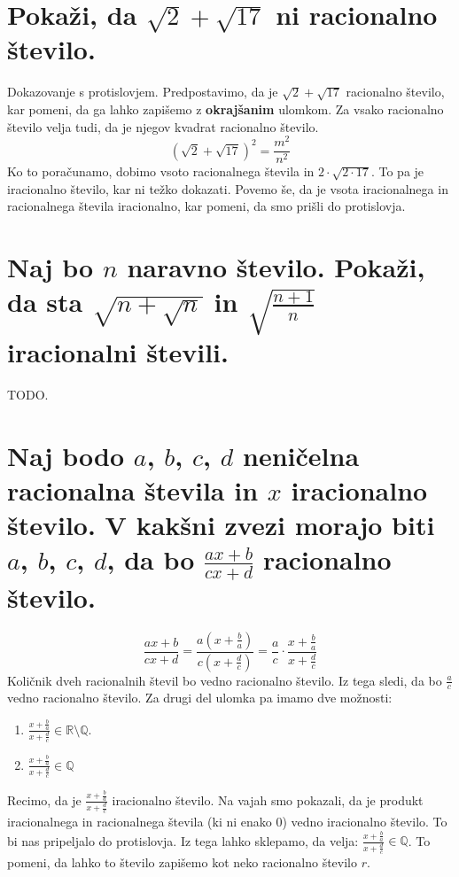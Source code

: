 \documentclass[12pt,a4paper,slovene]{article}
\begin{document}
\section{Pokaži, da $\sqrt{2} + \sqrt{17}$ ni racionalno število.}

Dokazovanje s protislovjem. Predpostavimo, da je $\sqrt{2} + \sqrt{17}$ racionalno število, kar pomeni, da ga lahko zapišemo z \textbf{okrajšanim} ulomkom. Za vsako racionalno število velja tudi, da je njegov kvadrat racionalno število.
\[
\left(\sqrt{2} + \sqrt{17}\right)^2 = \frac{m^2}{n^2}
\]
Ko to poračunamo, dobimo vsoto racionalnega števila in $2 \cdot \sqrt{2 \cdot 17}$. To pa je iracionalno število, kar ni težko dokazati. Povemo še, da je vsota iracionalnega in racionalnega števila iracionalno, kar pomeni, da smo prišli do protislovja.

\section{Naj bo $n$ naravno število. Pokaži, da sta $\sqrt{n + \sqrt{n}}$ in $\sqrt{\frac{n+1}{n}}$ iracionalni števili.}
TODO.

\section{Naj bodo $a$, $b$, $c$, $d$ neničelna racionalna števila in $x$ iracionalno število. V kakšni zvezi morajo biti $a$, $b$, $c$, $d$, da bo $\frac{ax + b}{cx + d}$ racionalno število.}

\[
\frac{ax + b}{cx + d} = \frac{a(x + \frac{b}{a})}{c(x + \frac{d}{c})} = \frac{a}{c} \cdot \frac{x + \frac{b}{a}}{x + \frac{d}{c}}
\]
Količnik dveh racionalnih števil bo vedno racionalno število. Iz tega sledi, da bo $\frac{a}{c}$ vedno racionalno število. Za drugi del ulomka pa imamo dve možnosti:

\begin{enumerate}
	\item $\frac{x + \frac{b}{a}}{x + \frac{d}{c}} \in \mathbb{R} \setminus \mathbb{Q}$.
	\item  $\frac{x + \frac{b}{a}}{x + \frac{d}{c}} \in \mathbb{Q}$
\end{enumerate}

Recimo, da je $\frac{x + \frac{b}{a}}{x + \frac{d}{c}}$ iracionalno število. Na vajah smo pokazali, da je produkt iracionalnega in racionalnega števila (ki ni enako $0$) vedno iracionalno število. To bi nas pripeljalo do protislovja. Iz tega lahko sklepamo, da velja: $\frac{x + \frac{b}{a}}{x + \frac{d}{c}} \in \mathbb{Q}$. To pomeni, da lahko to število zapišemo kot neko racionalno število $r$.
\end{document}
